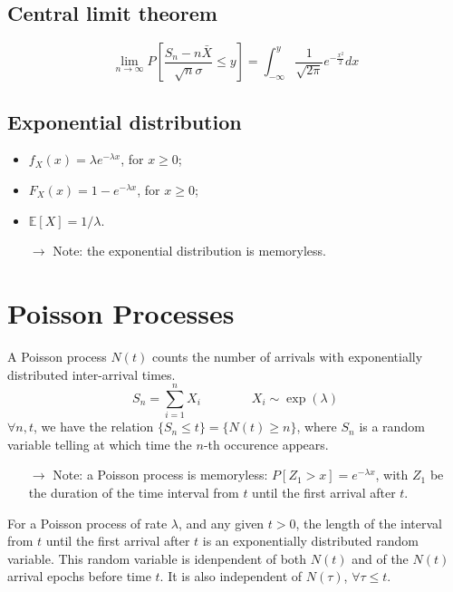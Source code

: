\documentclass[12pt, openany]{report}
\newcommand{\E}{\mathbb{E}}
\theoremstyle{definition}
\begin{document}
\section{Central limit theorem}
\begin{equation}
  \lim_{n\to \infty} P\left[\frac{S_n-n\bar X}{\sqrt{n}\sigma}\le y\right] = \int_{-\infty}^y \frac{1}{\sqrt{2\pi}} e^{-\frac{x^2}{2}}dx
\end{equation}
\section{Exponential distribution}
\begin{itemize}
  \item $f_X(x)=\lambda e^{-\lambda x}$, for $x\ge 0$;
  \item $F_X(x)=1-e^{-\lambda x}$, for $x\ge 0$;
  \item $\E[X]=1/\lambda$.
  \item [$\rightarrow$] Note: the exponential distribution is memoryless.
\end{itemize}
\chapter{Poisson Processes}\label{chap:poisson}
A Poisson process $N(t)$ counts the number of arrivals with exponentially distributed inter-arrival times. 
\begin{equation}
  S_n = \sum_{i=1}^n X_i \qquad \qquad X_i \sim \exp(\lambda)
\end{equation}
$\forall n,t$, we have the relation $\{S_n\le t\}=\{N(t)\ge n\}$, where $S_n$ is a random variable telling at which time the $n$-th occurence appears.\\
\begin{itemize}
  \item [$\rightarrow$] Note: a Poisson process is memoryless: $P[Z_1>x]=e^{-\lambda x}$, with $Z_1$ be the duration of the time interval from $t$ until the first arrival after $t$.
\end{itemize}
For a Poisson process of rate $\lambda$, and any given $t>0$, the length of the interval from $t$ until the first arrival after $t$ is an exponentially distributed random variable. This random variable is idenpendent of both $N(t)$ and of the $N(t)$ arrival epochs before time $t$. It is also independent of $N(\tau)$, $\forall \tau \le t$.\\
\end{document}
